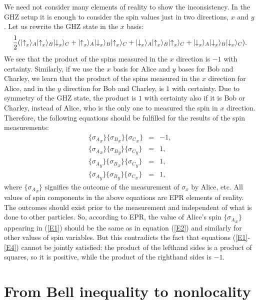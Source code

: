 \documentclass[11pt]{article}
\begin{document}
 We need not  consider many elements of reality to show the inconsistency. In the GHZ setup it is enough to consider the spin values  just in two directions, $x$ and $y$. Let us rewrite the GHZ state in the $x$ basis:
\begin{equation}
\nonumber
 {1\over
  2}(|{\uparrow}_x\rangle_A
|{\uparrow}_x\rangle_B|{\downarrow}_x\rangle_C
 + |{\uparrow}_x\rangle_A
|{\downarrow}_x\rangle_B|{\uparrow}_x\rangle_C
 +
|{\downarrow}_x\rangle_A
|{\uparrow}_x\rangle_B|{\uparrow}_x\rangle_C +
|{\downarrow}_x\rangle_A
|{\downarrow}_x\rangle_B|{\downarrow}_x\rangle_C).
\end{equation}
We see that the product of the spins  measured in the $x$ direction is $-1$ with certainty.
Similarly, if we use the $x$ basis for Alice and $y$ bases for Bob and Charley, we learn that the product of the spins measured in the $x$ direction for Alice, and in the $y$ direction for Bob and Charley, is $1$ with certainty. Due to symmetry of the GHZ state, the product is $1$ with certainty also if it is Bob or Charley, instead of Alice, who  is the only one to measured the spin in $x$ direction. Therefore, the following equations should be fulfilled for the results of the spin measurements:
\begin{eqnarray}
 \{{\sigma_A}_x\} \{{\sigma_B}_x\} \{{\sigma_C}_x\} & = &  -1 , \label{E1}\\
 \{{\sigma_A}_x\} \{{\sigma_B}_y\} \{{\sigma_C}_y\} & = & 1 ,\label{E2}\\
\{{\sigma_A}_y\} \{{\sigma_B}_x\} \{{\sigma_C}_y\} & = & 1 , \label{E3}\\
 \{{\sigma_A}_y\} \{{\sigma_B}_y\} \{{\sigma_C}_x\} & = & 1 ,\label{E4}
\end{eqnarray}
\noindent
where $\{{\sigma_A}_x\}$ signifies the outcome of the measurement  of
$\sigma_x$ by  Alice, etc.
 All values of  spin components  in the above equations are  EPR elements of reality. The outcomes should exist prior to the measurement and independent of what is done to other particles. So, according to EPR, the value of Alice's spin $\{{\sigma_A}_x\}$ appearing in (\ref{E1}) should be the same as in equation (\ref{E2}) and similarly for other values of spin variables. But this contradicts the fact that equations (\ref{E1}-\ref{E4}) cannot be jointly satisfied: the product of the lefthand sides is a product of squares, so it is positive, while the product of the righthand sides is $-1$.

\section{From Bell inequality to nonlocality }
\end{document}
